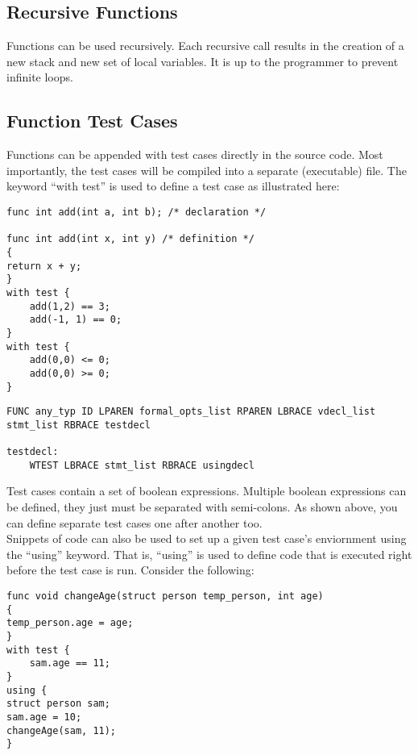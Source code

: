 \documentclass{article}
\begin{document}

\subsection{Recursive Functions}

Functions can be used recursively. Each recursive call results in the creation of a new stack and new set of local variables. It is up to the programmer to prevent infinite loops. 

\subsection{Function Test Cases}
Functions can be appended with test cases directly in the source code. Most importantly, the test cases will be compiled into a separate (executable) file. The keyword ``with test'' is used to define a test case as illustrated here:

\begin{lstlisting}
func int add(int a, int b); /* declaration */

func int add(int x, int y) /* definition */
{
return x + y;
}
with test {
	add(1,2) == 3;
	add(-1, 1) == 0;
}
with test {
	add(0,0) <= 0;
	add(0,0) >= 0; 
}

\end{lstlisting}

\begin{Verbatim}[frame=single]
FUNC any_typ ID LPAREN formal_opts_list RPAREN LBRACE vdecl_list stmt_list RBRACE testdecl 

testdecl:
	WTEST LBRACE stmt_list RBRACE usingdecl
\end{Verbatim}

Test cases contain a set of boolean expressions. Multiple boolean expressions can be defined, they just must be separated with semi-colons. As shown above, you can define separate test cases one after another too. \\ 
Snippets of code can also be used to set up a given test case's enviornment using the ``using'' keyword. That is, ``using'' is used to define code that is executed right before the test case is run. Consider the following:

\begin{lstlisting}
func void changeAge(struct person temp_person, int age)
{
temp_person.age = age;
}
with test {
	sam.age == 11;
}
using {
struct person sam;
sam.age = 10;
changeAge(sam, 11);
}


\end{lstlisting}
\end{document}

